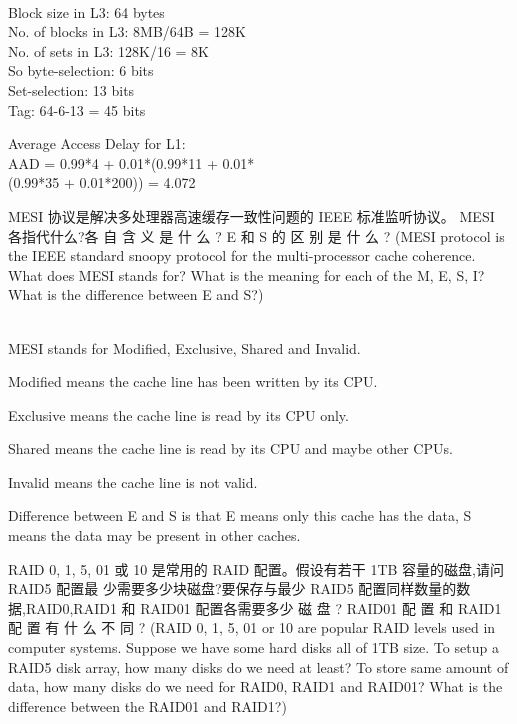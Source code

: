 \documentclass[a4paper, 12pt, addpoints, answers]{exam}
\begin{document}
\begin{questions}
\begin{solution}
{ } \\
Block size in L3: 64 bytes \\
No. of blocks in L3: 8MB/64B = 128K \\
No. of sets in L3: 128K/16 = 8K \\
So byte-selection: 6 bits \\
Set-selection: 13 bits \\
Tag: 64-6-13 = 45 bits \\
\raggedright Average Access Delay for L1: \\
\centering AAD = 0.99*4 + 0.01*(0.99*11 + 0.01* \\
(0.99*35 + 0.01*200)) = 4.072   \\
\end{solution}

\question[10]
MESI 协议是解决多处理器高速缓存一致性问题的 IEEE 标准监听协议。 MESI 各指代什么?各
自 含 义 是 什 么 ? E 和 S 的 区 别 是 什 么 ? (MESI protocol is the IEEE standard snoopy protocol for the
multi-processor cache coherence. What does MESI stands for? What is the meaning for each of the M, E, S, I? What
is the difference between E and S?)

\begin{solution}
{ } \\
MESI stands for Modified, Exclusive, Shared and Invalid. \\
\raggedright Modified means the cache line has been written by its CPU. \\
\raggedright Exclusive means the cache line is read by its CPU only. \\
\raggedright Shared means the cache line is read by its CPU and maybe other CPUs.   \\
\raggedright Invalid means the cache line is not valid. \\
\raggedright Difference between E and S is that E means only this cache has the data, S means the data may be present in other caches.
\end{solution}


\question[10]
RAID 0, 1, 5, 01 或 10 是常用的 RAID 配置。假设有若干 1TB 容量的磁盘,请问 RAID5 配置最
少需要多少块磁盘?要保存与最少 RAID5 配置同样数量的数据,RAID0,RAID1 和 RAID01 配置各需要多少
磁 盘 ? RAID01 配 置 和 RAID1 配 置 有 什 么 不 同 ? (RAID 0, 1, 5, 01 or 10 are popular RAID levels used in
computer systems. Suppose we have some hard disks all of 1TB size. To setup a RAID5 disk array, how many disks
do we need at least? To store same amount of data, how many disks do we need for RAID0, RAID1 and RAID01?
What is the difference between the RAID01 and RAID1?)


\end{questions}
\end{document}
